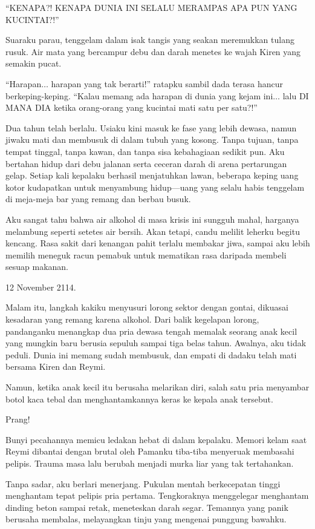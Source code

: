 ``KENAPA?! KENAPA DUNIA INI SELALU MERAMPAS APA PUN YANG KUCINTAI?!''

Suaraku parau, tenggelam dalam isak tangis yang seakan meremukkan tulang rusuk. Air mata yang bercampur debu dan darah menetes ke wajah Kiren yang semakin pucat.

``Harapan$\dots$ harapan yang tak berarti!'' ratapku sambil dada terasa hancur berkeping-keping. ``Kalau memang ada harapan di dunia yang kejam ini$\dots$ lalu DI MANA DIA ketika orang-orang yang kucintai mati satu per satu?!''

Dua tahun telah berlalu. Usiaku kini masuk ke fase yang lebih dewasa, namun jiwaku mati dan membusuk di dalam tubuh yang kosong. Tanpa tujuan, tanpa tempat tinggal, tanpa kawan, dan tanpa sisa kebahagiaan sedikit pun. Aku bertahan hidup dari debu jalanan serta ceceran darah di arena pertarungan gelap. Setiap kali kepalaku berhasil menjatuhkan lawan, beberapa keping uang kotor kudapatkan untuk menyambung hidup—uang yang selalu habis tenggelam di meja-meja bar yang remang dan berbau busuk.

Aku sangat tahu bahwa air alkohol di masa krisis ini sungguh mahal, harganya melambung seperti setetes air bersih. Akan tetapi, candu melilit leherku begitu kencang. Rasa sakit dari kenangan pahit terlalu membakar jiwa, sampai aku lebih memilih meneguk racun pemabuk untuk mematikan rasa daripada membeli sesuap makanan.

12 November 2114.

Malam itu, langkah kakiku menyusuri lorong sektor dengan gontai, dikuasai kesadaran yang remang karena alkohol. Dari balik kegelapan lorong, pandanganku menangkap dua pria dewasa tengah memalak seorang anak kecil yang mungkin baru berusia sepuluh sampai tiga belas tahun. Awalnya, aku tidak peduli. Dunia ini memang sudah membusuk, dan empati di dadaku telah mati bersama Kiren dan Reymi.

Namun, ketika anak kecil itu berusaha melarikan diri, salah satu pria menyambar botol kaca tebal dan menghantamkannya keras ke kepala anak tersebut.

Prang!

Bunyi pecahannya memicu ledakan hebat di dalam kepalaku. Memori kelam saat Reymi dibantai dengan brutal oleh Pamanku tiba-tiba menyeruak membasahi pelipis. Trauma masa lalu berubah menjadi murka liar yang tak tertahankan.

Tanpa sadar, aku berlari menerjang. Pukulan mentah berkecepatan tinggi menghantam tepat pelipis pria pertama. Tengkoraknya menggelegar menghantam dinding beton sampai retak, meneteskan darah segar. Temannya yang panik berusaha membalas, melayangkan tinju yang mengenai punggung bawahku.

